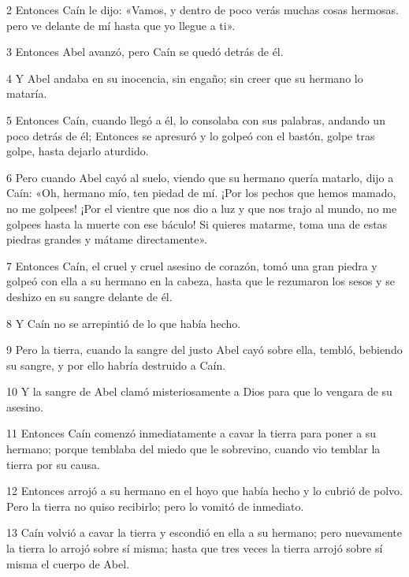 \par 2 Entonces Caín le dijo: «Vamos, y dentro de poco verás muchas cosas hermosas. pero ve delante de mí hasta que yo llegue a ti».

\par 3 Entonces Abel avanzó, pero Caín se quedó detrás de él.

\par 4 Y Abel andaba en su inocencia, sin engaño; sin creer que su hermano lo mataría.

\par 5 Entonces Caín, cuando llegó a él, lo consolaba con sus palabras, andando un poco detrás de él; Entonces se apresuró y lo golpeó con el bastón, golpe tras golpe, hasta dejarlo aturdido.

\par 6 Pero cuando Abel cayó al suelo, viendo que su hermano quería matarlo, dijo a Caín: «Oh, hermano mío, ten piedad de mí. ¡Por los pechos que hemos mamado, no me golpees! ¡Por el vientre que nos dio a luz y que nos trajo al mundo, no me golpees hasta la muerte con ese báculo! Si quieres matarme, toma una de estas piedras grandes y mátame directamente».

\par 7 Entonces Caín, el cruel y cruel asesino de corazón, tomó una gran piedra y golpeó con ella a su hermano en la cabeza, hasta que le rezumaron los sesos y se deshizo en su sangre delante de él.

\par 8 Y Caín no se arrepintió de lo que había hecho.

\par 9 Pero la tierra, cuando la sangre del justo Abel cayó sobre ella, tembló, bebiendo su sangre, y por ello habría destruido a Caín.

\par 10 Y la sangre de Abel clamó misteriosamente a Dios para que lo vengara de su asesino.

\par 11 Entonces Caín comenzó inmediatamente a cavar la tierra para poner a su hermano; porque temblaba del miedo que le sobrevino, cuando vio temblar la tierra por su causa.

\par 12 Entonces arrojó a su hermano en el hoyo que había hecho y lo cubrió de polvo. Pero la tierra no quiso recibirlo; pero lo vomitó de inmediato.

\par 13 Caín volvió a cavar la tierra y escondió en ella a su hermano; pero nuevamente la tierra lo arrojó sobre sí misma; hasta que tres veces la tierra arrojó sobre sí misma el cuerpo de Abel.

